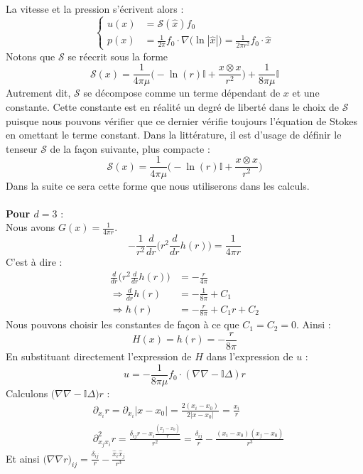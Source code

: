 La vitesse et la pression s'écrivent alors :
$$\begin{cases}
    u(x) &= \mathscr{S}(\hat{x})f_0 \\
    p(x) &= \displaystyle \frac{1}{2\pi} f_0 \cdot \nabla \Big( \ln |\hat{x}| \Big) = \frac{1}{2\pi r^2} f_0 \cdot \hat{x}
\end{cases}$$
Notons que $\mathscr{S}$ se réecrit sous la forme 
$$\mathscr{S}(x) = \frac{1}{4\pi \mu} \bigg( - \ln(r)\mathbb{I} + \frac{x \otimes x}{r^2} \bigg) + \frac{1}{8\pi \mu} \mathbb{I}$$
Autrement dit, $\mathscr{S}$ se décompose comme un terme dépendant de $x$ et une constante. Cette constante est en réalité un degré de liberté dans le choix de $\mathscr{S}$ puisque
nous pouvons vérifier que ce dernier vérifie toujours l'équation de Stokes en omettant le terme constant.
Dans la littérature, il est d'usage de définir le tenseur $\mathscr{S}$ de la façon suivante, plus compacte :
$$\mathscr{S}(x) = \frac{1}{4\pi \mu} \bigg( - \ln(r)\mathbb{I} + \frac{x \otimes x}{r^2} \bigg) $$
Dans la suite ce sera cette forme que nous utiliserons dans les calculs.\\
\\
\textbf{Pour $d = 3$} :\\
Nous avons $G(x) = \frac{1}{4\pi r}$.
$$ -\frac{1}{r^2}\frac{d}{dr}\bigg( r^2 \frac{d}{dr}h(r) \bigg) = \frac{1}{4\pi r} $$
C'est à dire :
\begin{align*}
    \frac{d}{dr} \bigg(r^2 \frac{d}{dr}h(r) \bigg) &= -\frac{r}{4\pi} \\
    \Rightarrow \frac{d}{dr} h(r) &= -\frac{1}{8\pi} + C_1 \\
    \Rightarrow h(r) &= -\frac{r}{8\pi} + C_1 r + C_2
\end{align*}
Nous pouvons choisir les constantes de façon à ce que $C_1 = C_2 = 0$.
Ainsi :
$$H(x) = h(r) = - \frac{r}{8\pi}$$
En substituant directement l'expression de $H$ dans l'expression de $u$ :
$$u = - \frac{1}{8\pi \mu} f_0 \cdot (\nabla \nabla - \mathbb{I} \Delta ) r $$
Calculons $\big( \nabla \nabla - \mathbb{I}\Delta \big) r $ : 
\begin{align*}
    &\partial_{x_i} r = \partial_{x_i} |x - x_0| = \frac{2(x_i-x_0)}{2|x - x_0|} = \frac{x_i}{r} \\
    &\partial_{x_j x_i}^2 r = \frac{\delta_{ij} r - x_i \frac{(x_j - x_0)}{r}}{r^2} = \frac{\delta_{ij}}{r} - \frac{(x_i - x_0)(x_j - x_0)}{r^3}
\end{align*}
Et ainsi $\displaystyle \big(\nabla \nabla r\big)_{ij} = \frac{\delta_{ij}}{r} - \frac{\hat{x}_i \hat{x}_j }{r^3} $
